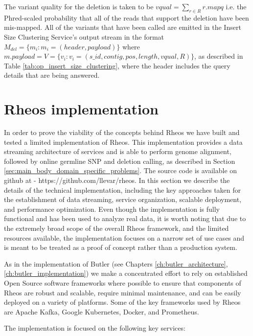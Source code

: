 The variant quality for the deletion is taken to be $vqual = \sum_{r \in R}{r.mapq}$ i.e. the Phred-scaled probability that all of the reads that support the deletion have been mis-mapped. All of the variants that have been called are emitted in the Insert Size Clustering Service's output stream in the format $M_{del} = \{m_i: m_i = (header, payload)\}$ where $m.payload = V = \{v_i: v_i = (s\_id, contig, pos, length, vqual, R)\}$, as described in Table \ref{tab:op_insert_size_clustering}, where the header includes the query details that are being answered.


\section{Rheos implementation}

In order to prove the viability of the concepts behind Rheos we have built and tested a limited implementation of Rheos. This implementation provides a data streaming architecture of services and is able to perform genome alignment, followed by online germline SNP and deletion calling, as described in Section \ref{sec:main_body_domain_specific_problems}. The source code is available on github at - https://github.com/llevar/rheos. In this section we describe the details of the technical implementation, including the key approaches taken for the establishment of data streaming, service organization, scalable deployment, and performance optimization. Even though the implementation is fully functional and has been used to analyze real data, it is worth noting that due to the extremely broad scope of the overall Rheos framework, and the limited resources available, the implementation focuses on a narrow set of use cases and is meant to be treated as a proof of concept rather than a production system.

As in the implementation of Butler (see Chapters \ref{ch:butler_architecture}, \ref{ch:butler_implementation}) we make a concentrated effort to rely on established Open Source software frameworks where possible to ensure that components of Rheos are robust and scalable, require minimal maintenance, and can be easily deployed on a variety of platforms. Some of the key frameworks used by Rheos are Apache Kafka, Google Kubernetes, Docker, and Prometheus.

The implementation is focused on the following key services:


